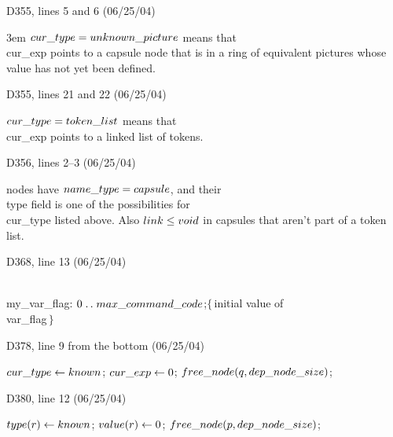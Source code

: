 {{\bugonpage D355, lines 5 and 6 (06/25/04)

\noindent\hangindent 3em
$\\{cur\_type}=\\{unknown\_picture}$ means that \\{cur\_exp} points to a
capsule node that is in
a ring of equivalent pictures whose value has not yet been defined.

\bugonpage D355, lines 21 and 22 (06/25/04)

\noindent
$\\{cur\_type}=\\{token\_list}$ means that \\{cur\_exp} points to a linked list
of tokens.

\bugonpage D356, lines 2--3 (06/25/04)

\noindent
nodes have $\\{name\_type}=\\{capsule}$,
and their \\{type} field is one of the possibilities for \\{cur\_type}
listed above.
Also $\\{link}\le\\{void}$ in capsules that aren't part of a token list.

\bugonpage D368, line 13 (06/25/04)

\ninepoint\noindent
\qquad\\{my\_var\_flag}: $0\to\\{max\_command\_code}$;\quad$\{\,$initial
  value of \\{var\_flag}$\,\}$

\bugonpage D378, line 9 from the bottom (06/25/04)

\ninepoint\noindent
\qquad{} $\\{cur\_type}\gets\\{known}$;
 $\\{cur\_exp}\gets0$;
 $\\{free\_node}(q,\\{dep\_node\_size})$;

\bugonpage D380, line 12 (06/25/04)

\ninepoint\noindent
\qquad{} $\\{type}(r)\gets\\{known}$;
 $\\{value}(r)\gets0$;
 $\\{free\_node}(p,\\{dep\_node\_size})$;

}}

